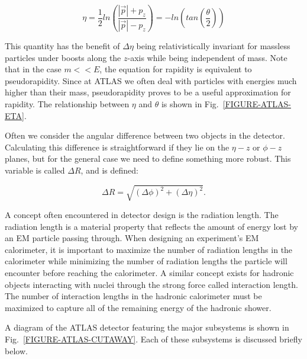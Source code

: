 \begin{equation}
 \eta = \frac{1}{2}ln\left(\frac{\left|\vec{p}\right|+p_z}{\left|\vec{p}\right|-p_z}\right)  = -ln\left(tan\left(\frac{\theta}{2}\right)\right)
\end{equation}

\noindent
This quantity has the benefit of $\Delta\eta$ being relativistically invariant for massless particles under boosts along the $z$-axis while being independent of mass. Note that in the case $m << E$, the equation for rapidity is equivalent to pseudorapidity. Since at ATLAS we often deal with particles with energies much higher than their mass, pseudorapidity proves to be a useful approximation for rapidity. The relationship between $\eta$ and $\theta$ is shown in Fig.~\ref{FIGURE-ATLAS-ETA}.

Often we consider the angular difference between two objects in the detector. Calculating this difference is straightforward if they lie on the $\eta-z$ or $\phi-z$ planes, but for the general case we need to define something more robust. This variable is called $\Delta R$, and is defined:

\begin{equation}
\Delta R = \sqrt{\left(\Delta\phi\right)^2+\left(\Delta\eta\right)^2}.
\end{equation}

\noindent
A concept often encountered in detector design is the radiation length. The radiation length is a material property that reflects the amount of energy lost by an EM particle passing through. When designing an experiment's EM calorimeter, it is important to maximize the number of radiation lengths in the calorimeter while minimizing the number of radiation lengths the particle will encounter before reaching the calorimeter. A similar concept exists for hadronic objects interacting with nuclei through the strong force called interaction length. The number of interaction lengths in the hadronic calorimeter must be maximized to capture all of the remaining energy of the hadronic shower.


A diagram of the ATLAS detector featuring the major subsystems is shown in Fig.~\ref{FIGURE-ATLAS-CUTAWAY}. Each of these subsystems is discussed briefly below.

